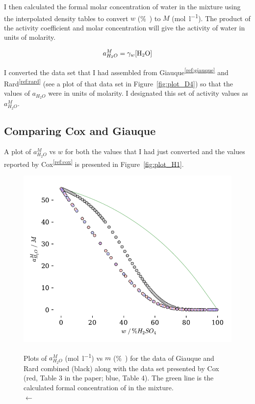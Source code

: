\documentclass[]{tufte-handout}
\newcommand{\tss}[1]{\textsuperscript{#1}}
\begin{document}
I then calculated the formal molar concentration of water in the mixture using the interpolated density tables to convert $w$ (\unit{\percent{}}) to $M$ (\unit{\mol\per\litre}). The product of the activity coefficient and molar concentration will give the activity of water in units of molarity.

$$a_{H_2O}^M = \gamma_w [\ce{H2O}]$$

I converted the data set that I had assembled from Giauque\tss{\ref{ref:giauque}} and Rard\tss{\ref{ref:rard}} (see a plot of that data set in Figure~\vref{fig:plot_D4}) so that the values of $a_{H_2O}$ were in units of molarity. I designated this set of activity values as $a_{H_2O}^M$. 
\subsection{Comparing Cox and Giauque}
A plot of $a_{H_2O}^M$ vs $w$ for both the values that I had just converted and the values reported by Cox\tss{\ref{ref:cox}} is presented in Figure~\vref{fig:plot_H1}.

\begin{figure}
  \centering
  \caption{Plots of $a_{H_2O}^M$ (\unit{\mole\per\litre}) vs $m$ (\unit{\percent{}}) for the data of Giauque and Rard combined (black) along with the data set presented by Cox (red, Table 3 in the paper; blue, Table 4). The green line is the calculated formal concentration of  in the mixture.\\ $\longleftarrow$} 
 \includegraphics[scale=0.75]{images/plot_H1} 
  \label{fig:plot_H1}
\end{figure}
\end{document}

